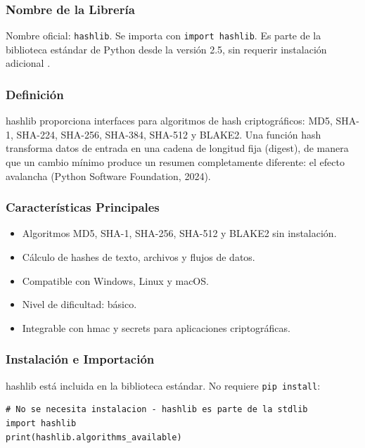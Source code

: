 \documentclass[12pt,a4paper]{article}
\begin{document}
\subsubsection{Nombre de la Librería}

Nombre oficial: \texttt{hashlib}. Se importa con \texttt{import hashlib}.
Es parte de la biblioteca estándar de Python desde la versión 2.5, sin
requerir instalación adicional \cite{psf2024}.

\subsubsection{Definición}

hashlib proporciona interfaces para algoritmos de hash criptográficos:
MD5, SHA-1, SHA-224, SHA-256, SHA-384, SHA-512 y BLAKE2. Una función
hash transforma datos de entrada en una cadena de longitud fija
(digest), de manera que un cambio mínimo produce un resumen
completamente diferente: el efecto avalancha (Python Software Foundation,
2024).

\subsubsection{Características Principales}

\begin{itemize}
\item Algoritmos MD5, SHA-1, SHA-256, SHA-512 y BLAKE2 sin instalación.
\item Cálculo de hashes de texto, archivos y flujos de datos.
\item Compatible con Windows, Linux y macOS.
\item Nivel de dificultad: básico.
\item Integrable con hmac y secrets para aplicaciones criptográficas.
\end{itemize}

\subsubsection{Instalación e Importación}

hashlib está incluida en la biblioteca estándar. No requiere \texttt{pip install}:

\begin{lstlisting}[caption={Carga de hashlib sin instalación},
                   label=lst:hashlib_import]
# No se necesita instalacion - hashlib es parte de la stdlib
import hashlib
print(hashlib.algorithms_available)
\end{lstlisting}
\end{document}
